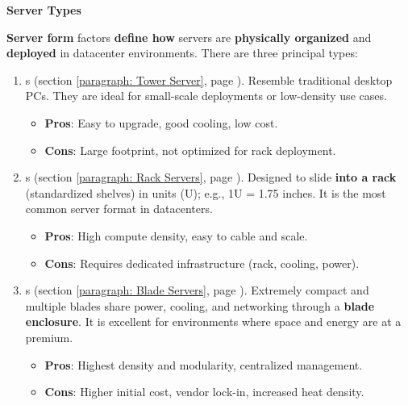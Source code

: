 \highspace
\begin{flushleft}
    \textcolor{Green3}{ \textbf{Server Types}}
\end{flushleft}
\textbf{Server form} factors \textbf{define how} servers are \textbf{physically organized} and \textbf{deployed} in datacenter environments. There are three principal types:
\begin{enumerate}
    \item {}s (section \ref{paragraph: Tower Server}, page \pageref{paragraph: Tower Server}). Resemble traditional desktop PCs. They are ideal for small-scale deployments or low-density use cases.
    \begin{itemize}
        \item[\textcolor{Green3}{\faIcon{check}}] \textcolor{Green3}{\textbf{Pros}}: Easy to upgrade, good cooling, low cost.
        \item[\textcolor{Red2}{\faIcon{times}}] \textcolor{Red2}{\textbf{Cons}}: Large footprint, not optimized for rack deployment.
    \end{itemize}

    \item {}s (section \ref{paragraph: Rack Servers}, page \pageref{paragraph: Rack Servers}). Designed to slide \textbf{into a rack} (standardized shelves) in units (U); e.g., 1U = 1.75 inches. It is the most common server format in datacenters.
    \begin{itemize}
        \item[\textcolor{Green3}{\faIcon{check}}] \textcolor{Green3}{\textbf{Pros}}: High compute density, easy to cable and scale.
        \item[\textcolor{Red2}{\faIcon{times}}] \textcolor{Red2}{\textbf{Cons}}: Requires dedicated infrastructure (rack, cooling, power).
    \end{itemize}
    
    \item {}s (section \ref{paragraph: Blade Servers}, page \pageref{paragraph: Blade Servers}). Extremely compact and multiple blades share power, cooling, and networking through a \textbf{blade enclosure}. It is excellent for environments where space and energy are at a premium.
    \begin{itemize}
        \item[\textcolor{Green3}{\faIcon{check}}] \textcolor{Green3}{\textbf{Pros}}: Highest density and modularity, centralized management.
        \item[\textcolor{Red2}{\faIcon{times}}] \textcolor{Red2}{\textbf{Cons}}: Higher initial cost, vendor lock-in, increased heat density.
    \end{itemize}
\end{enumerate}

